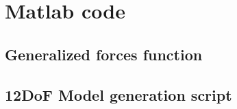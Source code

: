 \chapter{Matlab code}
\section{Generalized forces function}
\label{sec:genforces}

\section{12DoF Model generation script}
\label{sec:12dofcode}

